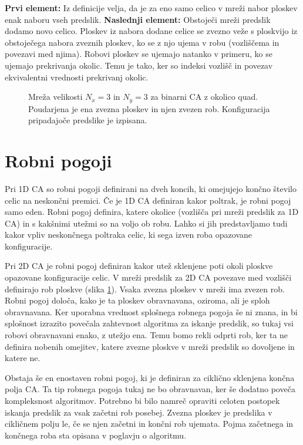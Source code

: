 \documentclass[12pt,a4paper,openany,twoside]{book}
\begin{document}
\textbf{Prvi element:}
Iz definicije velja, da je za eno samo celico v mreži nabor ploskev enak naboru vseh predslik.
\textbf{Naslednji element:}
Obstoječi mreži predslik dodamo novo celico.
Ploskev iz nabora dodane celice se zvezno veže s ploskvijo
iz obstoječega nabora zveznih ploskev,
ko se z njo ujema v robu (vozliščema in povezavi med njima).
Robovi ploskev se ujemajo natanko v primeru, ko se ujemajo prekrivanja okolic.
Temu je tako, ker so indeksi vozlišč in povezav ekvivalentni vrednosti prekrivanj okolic.

\begin{figure}[htb]
\centerline{}
\caption[Mreža polja celic.]{Mreža velikosti \(N_x=3\) in \(N_y=3\) za binarni CA z okolico quad.
Poudarjena je ena zvezna ploskev in njen zvezen rob. Konfiguracija pripadajoče predslike je izpisana.}
\label{network_array}
\end{figure}

\section{Robni pogoji} 

Pri 1D CA so robni pogoji definirani na dveh koncih,
ki omejujejo končno število celic na neskončni premici.
Če je 1D CA definiran kakor poltrak, je robni pogoj samo eden.
Robni pogoj definira, katere okolice (vozlišča pri mreži predslik za 1D CA)
in s kakšnimi utežmi so na voljo ob robu.
Lahko si jih predstavljamo tudi kakor vpliv neskončnega poltraka celic,
ki sega izven roba opazovane konfiguracije.

Pri 2D CA je robni pogoj definiran kakor utež sklenjene poti okoli ploskve opazovane konfiguracije celic.
V mreži predslik za 2D CA povezave med vozlišči definirajo rob ploskve (slika \ref{network_array}).
Vsaka zvezna ploskev v mreži ima zvezen rob. Robni pogoj določa, kako je ta ploskev obravnavana,
oziroma, ali je sploh obravnavana.
Ker uporabna vrednost splošnega robnega pogoja še ni znana,
in bi splošnost izrazito povečala zahtevnost algoritma za iskanje predslik,
so tukaj vsi robovi obravnavani enako, z utežjo ena. Temu bomo rekli odprti rob,
ker ta ne definira nobenih omejitev, katere zvezne ploskve v mreži predslik
so dovoljene in katere ne.

Obstaja še en enostaven robni pogoj, ki je definiran za ciklično sklenjena končna polja CA.
Ta tip robnega pogoja tukaj ne bo obravnavan, ker še dodatno poveča kompleksnost algoritmov.
Potrebno bi bilo namreč opraviti celoten postopek iskanja predslik za vsak začetni rob posebej.
Zvezna ploskev je predslika v cikličnem polju le, če se njen začetni in končni rob ujemata.
Pojma začetnega in končnega roba sta opisana v poglavju o algoritmu.
\end{document}
